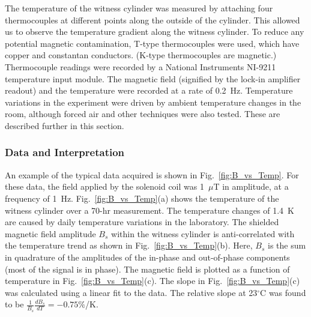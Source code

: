 The temperature of the witness cylinder was measured by attaching four
thermocouples at different points along the outside of the cylinder.
This allowed us to observe the temperature gradient along the witness
cylinder.  To reduce any potential magnetic contamination, T-type
thermocouples were used, which have copper and constantan conductors.
(K-type thermocouples are magnetic.)  Thermocouple readings were
recorded by a National Instruments NI-9211 temperature input module.
The magnetic field (signified by the lock-in amplifier readout) and
the temperature were recorded at a rate of 0.2~Hz. Temperature
variations in the experiment were driven by ambient temperature
changes in the room, although forced air and other techniques were
also tested. These are described further in this section.


\subsubsection{Data and Interpretation\label{sec:axialsyst}}

An example of the typical data acquired is shown in
Fig.~\ref{fig:B_vs_Temp}.  For these data, the field applied by the
solenoid coil was 1~$\mu$T in amplitude, at a frequency of 1~Hz.
Fig.~\ref{fig:B_vs_Temp}(a) shows the temperature of the witness
cylinder over a 70-hr measurement.  The temperature changes of 1.4~K
are caused by daily temperature variations in the laboratory. The
shielded magnetic field amplitude $B_s$ within the witness cylinder is
anti-correlated with the temperature trend as shown in
Fig.~\ref{fig:B_vs_Temp}(b).  Here, $B_s$ is the sum in quadrature of
the amplitudes of the in-phase and out-of-phase components (most of
the signal is in phase).  The magnetic field is plotted as a function
of temperature in Fig.~\ref{fig:B_vs_Temp}(c).  The slope in
Fig.~\ref{fig:B_vs_Temp}(c) was calculated using a linear fit to the
data.  The relative slope at 23$^\circ$C was found to be
$\frac{1}{B_s}\frac{dB_s}{dT}=-0.75\%$/K.

